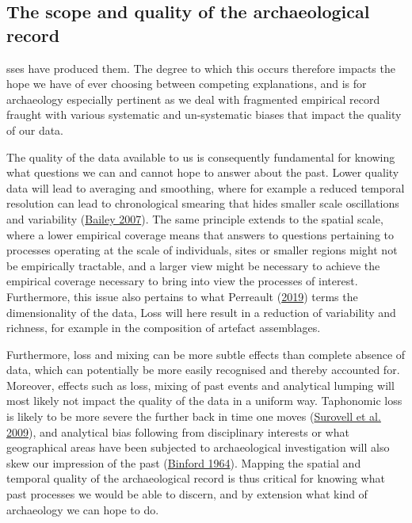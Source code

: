 \documentclass[
  a4paper,
  oneside]{uiophdthesis}
\begin{document}
\hypertarget{the-scope-and-quality-of-the-archaeological-record}{%
\subsection{The scope and quality of the archaeological record}\label{the-scope-and-quality-of-the-archaeological-record}}

sses have produced them. The degree to which this occurs therefore impacts the hope we have of ever choosing between competing explanations, and is for archaeology especially pertinent as we deal with fragmented empirical record fraught with various systematic and un-systematic biases that impact the quality of our data.

The quality of the data available to us is consequently fundamental for knowing what questions we can and cannot hope to answer about the past. Lower quality data will lead to averaging and smoothing, where for example a reduced temporal resolution can lead to chronological smearing that hides smaller scale oscillations and variability (\protect\hyperlink{ref-bailey2007}{Bailey 2007}). The same principle extends to the spatial scale, where a lower empirical coverage means that answers to questions pertaining to processes operating at the scale of individuals, sites or smaller regions might not be empirically tractable, and a larger view might be necessary to achieve the empirical coverage necessary to bring into view the processes of interest. Furthermore, this issue also pertains to what Perreault (\protect\hyperlink{ref-perreault2019}{2019}) terms the dimensionality of the data, Loss will here result in a reduction of variability and richness, for example in the composition of artefact assemblages.

Furthermore, loss and mixing can be more subtle effects than complete absence of data, which can potentially be more easily recognised and thereby accounted for. Moreover, effects such as loss, mixing of past events and analytical lumping will most likely not impact the quality of the data in a uniform way. Taphonomic loss is likely to be more severe the further back in time one moves (\protect\hyperlink{ref-surovell2009a}{Surovell et al. 2009}), and analytical bias following from disciplinary interests or what geographical areas have been subjected to archaeological investigation will also skew our impression of the past (\protect\hyperlink{ref-binford1964}{Binford 1964}). Mapping the spatial and temporal quality of the archaeological record is thus critical for knowing what past processes we would be able to discern, and by extension what kind of archaeology we can hope to do.
\end{document}
